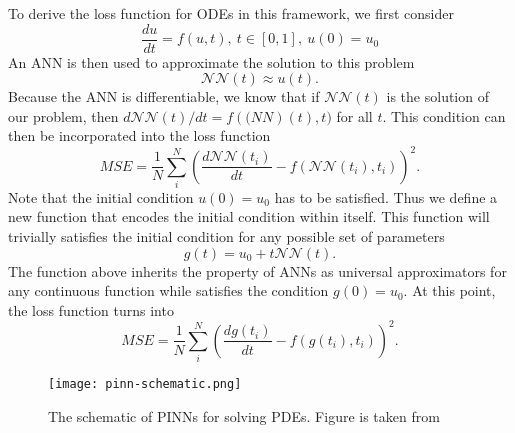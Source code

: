 To derive the loss function for \glspl{ODE} in this framework, we first consider \cite{lagarisArtificialNeuralNetworks1998}
\begin{equation*}
    \frac{du}{dt} = f(u, t),\ t \in [0, 1],\ u(0) = u_0
\end{equation*}
An \gls{ANN} is then used to approximate the solution to this problem
\begin{equation*}
    \mathcal{NN}(t) \approx u(t).
\end{equation*}
Because the \gls{ANN} is differentiable, we know that if $\mathcal{NN}(t)$ is the solution of our problem, then $d\mathcal{NN}(t)/dt = f(\mathcal(NN)(t), t)$ for all $t$.
This condition can then be incorporated into the loss function
\begin{equation*}
    MSE = \frac{1}{N} \sum_i^N \left( \frac{d\mathcal{NN}(t_i)}{dt} - f(\mathcal{NN}(t_i), t_i) \right)^2.
\end{equation*}
Note that the initial condition $u(0) = u_0$ has to be satisfied.
Thus we define a new function that encodes the initial condition within itself. This function will trivially satisfies the initial condition for any possible set of parameters
\begin{equation*}
    g(t) = u_0 + t\mathcal{NN}(t).
\end{equation*}
The function above inherits the property of \glspl{ANN} as universal approximators for any continuous function while satisfies the condition $g(0) = u_0$.
At this point, the loss function turns into
\begin{equation*}
    MSE = \frac{1}{N} \sum_i^N \left( \frac{dg(t_i)}{dt} - f(g(t_i), t_i) \right)^2.
\end{equation*}

\begin{figure}[h]
    \centering
    \texttt{[image: pinn-schematic.png]}
    \caption{The schematic of PINNs for solving PDEs. Figure is taken from \citeauthor{guoSolvingPartialDifferential2020} \cite{guoSolvingPartialDifferential2020}}
    \label{fig:pinn-schematic}
\end{figure}

